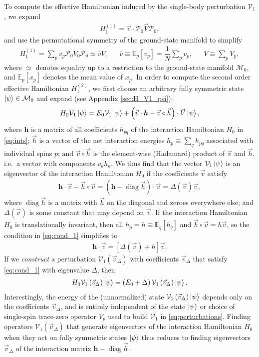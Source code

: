 \documentclass[nofootinbib,notitlepage,11pt]{revtex4-2}
\newcommand{\f}[2]{\dfrac{#1}{#2}} %
\newcommand{\p}[1]{\left(#1\right)} %
\renewcommand{\sp}[1]{\left[#1\right]} %
\renewcommand{\c}{\cdot} %
\renewcommand{\oc}{\circ} %
\newcommand{\m}{\bm} %
\renewcommand{\v}{\vec} %
\newcommand{\1}{\mathds{1}}
\newcommand{\M}{\mathcal{M}}
\renewcommand{\P}{\mathcal{P}}
\newcommand{\V}{\mathcal{V}}
\newcommand{\EE}{\mathbb{E}}
\DeclareMathOperator{\diag}{diag}
\begin{document}
To compute the effective Hamiltonian induced by the single-body
perturbation $\V_1$, we expand
\begin{align}
  H_1^{(1)} = \v v \c \P_0 \v V \P_0,
\end{align}
and use the permutational symmetry of the ground-state manifold to
simplify
\begin{align}
  H_1^{(1)} =  \sum_p v_p \P_0 V_0 \P_0 \simeq \bar v V,
  &&
  \bar v \equiv \EE_p\sp{v_p} = \f1N \sum_p v_p,
  &&
  V \equiv \sum_p V_p,
  \label{eq:H_1_1}
\end{align}
where $\simeq$ denotes equality up to a restriction to the
ground-state manifold $\M_0$, and $\EE_p\sp{x_p}$ denotes the mean
value of $x_p$.  In order to compute the second order effective
Hamiltonian $H_1^{(2)}$, we first choose an arbitrary fully symmetric
state $\ket\psi\in\M_0$ and expand (see Appendix \ref{sec:H_V1_psi}):
\begin{align}
  H_0 \V_1 \ket\psi
  = E_0 \V_1 \ket\psi
  + \p{\v v\c\m h - \v v\oc\v h}\c \v V \ket\psi,
  \label{eq:H_V1_psi_start}
\end{align}
where $\m h$ is a matrix of all coefficients $h_{pq}$ of the
interaction Hamiltonian $H_0$ in \eqref{eq:ints}; $\v h$ is a vector
of the net interaction energies $h_p\equiv\sum_qh_{pq}$ associated
with individual spins $p$; and $\v v\oc\v h$ is the element-wise
(Hadamard) product of $\v v$ and $\v h$, i.e.~a vector with components
$v_kh_k$.  We thus find that the vector $\V_1\ket\psi$ is an
eigenvector of the interaction Hamiltonian $H_0$ if the coefficients
$\v v$ satisfy
\begin{align}
  \m h \c \v v - \v h\oc\v v
  = \p{\m h - \diag\v h}\c\v v
  = \Delta\p{\v v} \v v,
  \label{eq:cond_1}
\end{align}
where $\diag\v h$ is a matrix with $\v h$ on the diagonal and zeroes
everywhere else; and $\Delta\p{\v v}$ is some constant that may depend
on $\v v$.  If the interaction Hamiltonian $H_0$ is translationally
invariant, then all $h_p=h\equiv\EE_q\sp{h_q}$ and
$\v h\oc\v v=h\v v$, so the condition in \eqref{eq:cond_1} simplifies
to
\begin{align}
  \m h \c\v v = \sp{\Delta\p{\v v}+h} \v v.
\end{align}
If we {\it construct} a perturbation $\V_1\p{\v v_\Delta}$ with
coefficients $\v v_\Delta$ that satisfy \eqref{eq:cond_1} with
eigenvalue $\Delta$, then
\begin{align}
  H_0 \V_1\p{\v v_\Delta} \ket\psi
  = \p{E_0 + \Delta} \V_1\p{\v v_\Delta} \ket\psi.
  \label{eq:H_V1_psi}
\end{align}
Interestingly, the energy of the (unnormalized) state
$\V_1\p{\v v_\Delta}\ket\psi$ depends only on the coefficients
$\v v_\Delta$, and is entirely independent of the state $\ket\psi$ or
choice of single-spin trace-zero operator $V_p$ used to build $\V_1$
in \eqref{eq:perturbations}.  Finding operators $\V_1\p{\v v_\Delta}$
that generate eigenvectors of the interaction Hamiltonian $H_0$ when
they act on fully symmetric states $\ket\psi$ thus reduces to finding
eigenvectors $\v v_\Delta$ of the interaction matrix $\m h-\diag\v h$.
\end{document}
